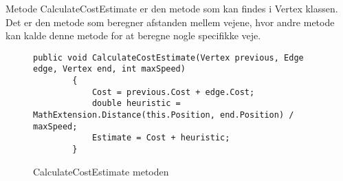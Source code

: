 \vspace{5mm}

Metode CalculateCostEstimate er den metode som kan findes i Vertex klassen. Det er den metode som beregner afstanden mellem vejene, hvor andre metode kan kalde denne metode for at beregne nogle specifikke veje. 
\begin{figure}[H]
\begin{lstlisting}
public void CalculateCostEstimate(Vertex previous, Edge edge, Vertex end, int maxSpeed)
        {
            Cost = previous.Cost + edge.Cost;
            double heuristic = MathExtension.Distance(this.Position, end.Position) / maxSpeed;
            Estimate = Cost + heuristic;
        }
\end{lstlisting}
\caption{CalculateCostEstimate metoden}\label{CalculateCostEstimateCode}
\end{figure}


